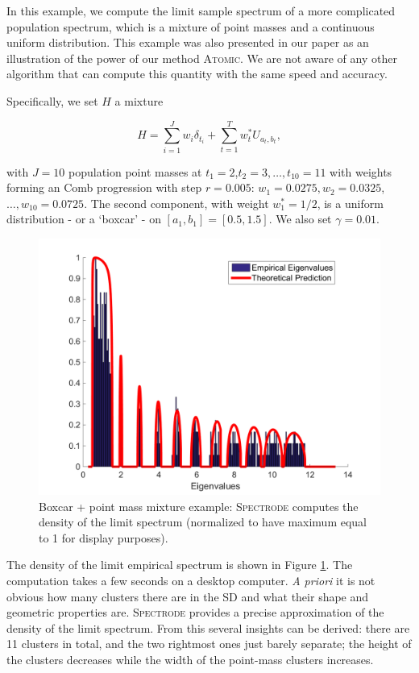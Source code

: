 \documentclass[english,11pt]{article} %
\begin{document}
In this example, we compute the limit sample spectrum of a more complicated population spectrum, which is a mixture of point masses and a continuous uniform distribution. This example was also presented in our paper \cite{dobriban2015precise} as an illustration of the power of our method \textsc{Atomic}. We are not aware of any other algorithm that can compute this quantity with the same speed and accuracy.

Specifically, we set $H$ a mixture

\begin{equation*}
\label{uniform_atomic}
H = \sum_{i=1}^{J} w_i \delta_{t_i} + \sum_{t=1}^{T} w^*_t U_{a_t,b_t} ,
\end{equation*}

with $J=10$ population point masses at $t_1=2$,$t_2=3,\ldots,t_{10}=11$ with weights forming an Comb progression with step $r = 0.005$: $w_1=0.0275, w_2=0.0325$,$\ldots, w_{10}=0.0725$. The second component, with weight $w^*_1=1/2$, is a uniform distribution - or a `boxcar' - on $[a_1,b_1]=[0.5,1.5]$.  We also set $\gamma=0.01$.


\begin{figure}
\centering
  \includegraphics[scale=0.45]{"../Experiments/Examples/Illustration_mixture_3"}
\caption{Boxcar + point mass mixture example: \textsc{Spectrode} computes  the density of the limit spectrum (normalized to have maximum equal to 1 for display purposes).}
\label{example_2}
\end{figure}

The density of the limit empirical spectrum is shown in Figure \ref{example_2}. The computation takes a few seconds on a desktop computer. \emph{A priori} it is not obvious how many clusters there are in the SD and what their shape and geometric properties are. \textsc{Spectrode} provides a precise approximation of the density of the limit spectrum. From this several insights can be derived: there are 11 clusters in total, and the two rightmost ones just barely separate; the height of the clusters decreases while the width of the point-mass clusters increases.
\end{document}
